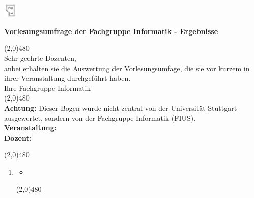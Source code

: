 \documentclass[10pt,a4paper]{article}
\author{Dominik Kesim, Magnus Specht, Sebastian Paule,}
\begin{document}
\begin{floatingfigure}[r]{0.03\textwidth}
\centering
\includegraphics[width=0.05\textwidth]{fius-logo.png}
\end{floatingfigure}
\vspace{-1cm}
\textbf{Vorlesungsumfrage der Fachgruppe Informatik - Ergebnisse}

\vspace{0.3cm}
\line(2,0){480} \\

Sehr geehrte Dozenten,\\
anbei erhalten sie die Auswertung der Vorlesungsumfage, die sie vor kurzem in ihrer Veranstaltung durchgeführt haben.
\\
Ihre Fachgruppe Informatik\\

\vspace{2pt}
\line(2,0){480}
\vspace{2pt}\\

\textbf{Achtung:} Dieser Bogen wurde nicht zentral von der Universität Stuttgart ausgewertet, sondern von der Fachgruppe Informatik (FIUS).\\

\textbf{Veranstaltung:}\hspace{0.1cm}
\\
\textbf{Dozent:}\hspace{0.2cm}

\vspace{2pt}
\line(2,0){480}
\vspace{2pt}\\

\begin{enumerate}
	\item
	
    \begin{itemize}
    	\setlength\itemsep{1em}
    	\item[]
    \end{itemize}
	
	\vspace{2pt}
	\line(2,0){480}
	\vspace{2pt}\\
\end{enumerate}
\end{document}
